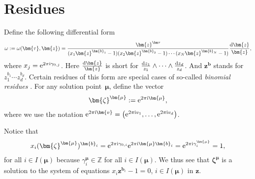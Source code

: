 \section{Residues}
\label{chap-res}
Define the following differential form
\begin{gather*}
\omega := \omega(\bm{\tau},\bm{z}) = \frac{\bm{z}^{\bm\tau}}{(x_1\bm{z}^{\bm{b}_1} - 1)(x_2\bm{z}^{\bm{b}_2} - 1) \cdots (x_N\bm{z}^{\bm{b}_N} - 1)} \frac{{\rm d}\bm{z}}{\bm{z}},
\end{gather*}
where $x_j={\rm e}^{2\pi {\rm i}\gamma_{0,j}}$.
Here $\frac{{\rm d}\bm{z}}{\bm{z}}$ is short for $\frac{{\rm d}z_1}{z_1} \wedge \dots \wedge \frac{{\rm d}z_d}{z_d}$. And $\bm{z}^{\bm{b}}$ stands for $z_1^{b_1}\cdots z_d^{b_d}$.
Certain residues of this form are special cases of so-called {\it binomial residues} \cite{Cat00}.
For any solution point~$\bm{\mu}$, define the vector
\begin{gather*}
\bm{\zeta}^{\bm{\mu}} := {\rm e}^{2\pi {\rm i} \bm{\mu}},
\end{gather*}
where we use the notation ${\rm e}^{2\pi {\rm i}\bm{v}}=\big({\rm e}^{2\pi {\rm i}v_1},\dots,{\rm e}^{2\pi {\rm i}v_d}\big)$.

Notice that
\begin{gather*}
x_i (\bm{\zeta}^{\bm{\mu}})^{\bm{b}_i}={\rm e}^{2\pi {\rm i}\gamma_{0,i}}
{\rm e}^{2\pi {\rm i}\bm{\mu}\bm{b}_i}={\rm e}^{2\pi {\rm i}\gamma^{\bm{\mu}}_i}=1,
\end{gather*}
for all $i\in I(\bm{\mu})$ because $\gamma^{\bm\mu}_i\in\mathbb{Z}$ for all $i\in I(\bm\mu)$.
We thus see that $\bm{\zeta}^{\bm\mu}$ is a solution to the system of equations
$x_i\bm{z}^{\bm{b}_i}-1=0$, $i\in I(\bm\mu)$ in $\bm{z}$.

